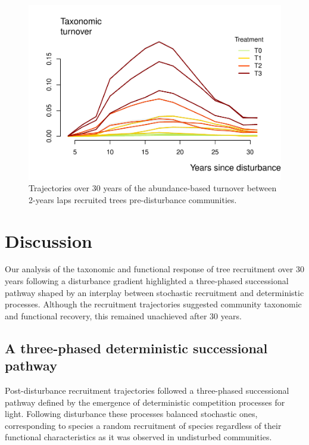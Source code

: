 \documentclass[fleqn,10pt]{ArtEcoFoG} %
\begin{document}
\begin{figure}

{\centering \includegraphics[width=1\linewidth]{RecruitmentTrajectories_files/figure-latex/Turnover-1} 

}

\caption{Trajectories over 30 years of the abundance-based turnover between 2-years laps recruited trees pre-disturbance communities.}\label{fig:Turnover}
\end{figure}

\section{Discussion}\label{discussion}

Our analysis of the taxonomic and functional response of tree
recruitment over 30 years following a disturbance gradient highlighted a
three-phased successional pathway shaped by an interplay between
stochastic recruitment and deterministic processes. Although the
recruitment trajectories suggested community taxonomic and functional
recovery, this remained unachieved after 30 years.

\subsection{A three-phased deterministic successional
pathway}\label{a-three-phased-deterministic-successional-pathway}

Post-disturbance recruitment trajectories followed a three-phased
successional pathway defined by the emergence of deterministic
competition processes for light. Following disturbance these processes
balanced stochastic ones, corresponding to species a random recruitment
of species regardless of their functional characteristics as it was
observed in undisturbed communities.
\end{document}
